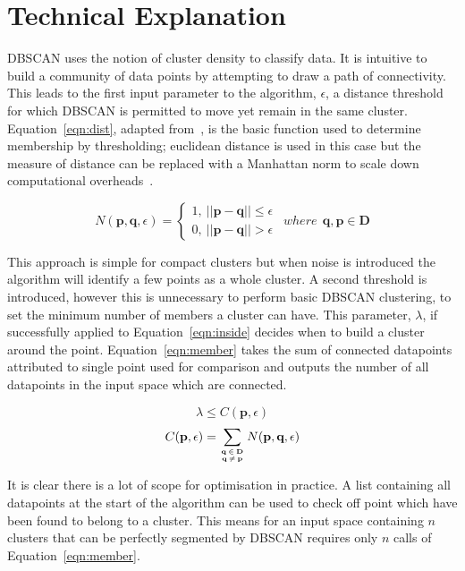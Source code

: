 \documentclass{ecsarticle}     %
\begin{document}
\section{Technical Explanation}

DBSCAN uses the notion of cluster density to classify data.
It is intuitive to build a community of data points by attempting to draw a path of connectivity.
This leads to the first input parameter to the algorithm, $\epsilon$, a distance threshold for which DBSCAN is permitted to move yet remain in the same cluster.
Equation~\eqref{eqn:dist}, adapted from~\cite{ester96dbscan}, is the basic function used to determine membership by thresholding; euclidean distance is used in this case but the measure of distance can be replaced with a Manhattan norm to scale down computational overheads~\citep{krause86taxicab}.

\newpage
\begin{equation}
	N(\textbf{p},\textbf{q},\epsilon) = \left\{
		\begin{array}{l}
    		1,\: ||\textbf{p} - \textbf{q}|| \leq \epsilon\\
    		0,\: ||\textbf{p} - \textbf{q}|| > \epsilon
  		\end{array} \right.
	\:\:where\:\: \textbf{q},\textbf{p} \in \textbf{D}
	\label{eqn:dist}
\end{equation}


This approach is simple for compact clusters but when noise is introduced the algorithm will identify a few points as a whole cluster.
A second threshold is introduced, however this is unnecessary to perform basic DBSCAN clustering, to set the minimum number of members a cluster can have.
This parameter, $\lambda$, if successfully applied to Equation~\eqref{eqn:inside} decides when to build a cluster around the point.
Equation~\eqref{eqn:member} takes the sum of connected datapoints attributed to single point used for comparison and outputs the number of all datapoints in the input space which are connected. 

\begin{equation}
	\lambda \leq C(\textbf{p},\epsilon) 
	\label{eqn:inside}
\end{equation}
\begin{equation}
	C(\textbf{p},\epsilon) = \sum\limits_{\textbf{q}\:\in\:\textbf{D}\atop\textbf{q}\:\neq\:\textbf{p}} N(\textbf{p},\textbf{q},\epsilon)
	\label{eqn:member}
\end{equation}

It is clear there is a lot of scope for optimisation in practice.
A list containing all datapoints at the start of the algorithm can be used to check off point which have been found to belong to a cluster.
This means for an input space containing $n$ clusters that can be perfectly segmented by DBSCAN requires only $n$ calls of Equation~\eqref{eqn:member}.
\end{document}
